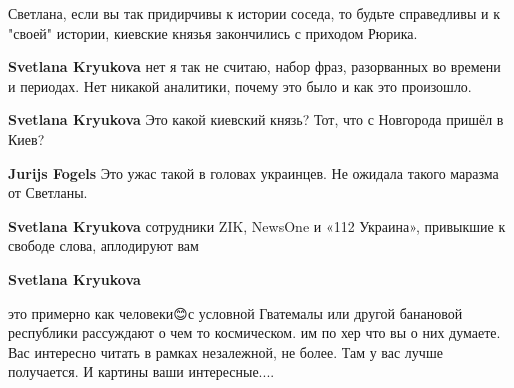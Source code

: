 \begin{itemize}
\begin{itemize}
 
Светлана, если вы так придирчивы к истории соседа, то будьте справедливы и к "своей" истории, киевские князья закончились с приходом Рюрика.

 
\textbf{Svetlana Kryukova} нет я так не считаю, набор фраз, разорванных во времени и периодах. Нет никакой аналитики, почему это было и как это произошло.

 
\textbf{Svetlana Kryukova} Это какой киевский князь? Тот, что с Новгорода пришёл в Киев?

 
\textbf{Jurijs Fogels} Это ужас такой в головах украинцев. Не ожидала такого маразма от Светланы.

 
\textbf{Svetlana Kryukova} сотрудники ZIK, NewsOne и «112 Украина», привыкшие к свободе слова, аплодируют вам

 
\textbf{Svetlana Kryukova} 

это примерно как человеки😊с условной Гватемалы или другой банановой республики
рассуждают о чем то космическом. им по хер что вы о них думаете. Вас интересно
читать в рамках незалежной, не более. Там у вас лучше получается. И картины
ваши интересные....



\end{itemize}
\end{itemize}
